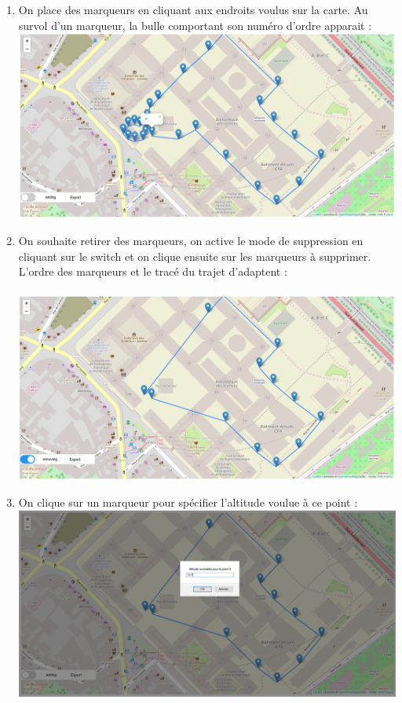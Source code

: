 \documentclass{article}
\begin{document}
\begin{enumerate}
   \item On place des marqueurs en cliquant aux endroits voulus sur la carte. Au survol d'un marqueur, la bulle comportant son numéro d'ordre apparait :\\
 \includegraphics[scale=0.42]{capt3.PNG} \\
  \item On souhaite retirer des marqueurs, on active le mode de suppression en cliquant sur le switch et on clique ensuite sur les marqueurs à supprimer. L'ordre des marqueurs et le tracé du trajet d'adaptent :\\ \\
 \includegraphics[scale=0.42]{capt5.PNG}
  \item On clique sur un marqueur pour spécifier l'altitude voulue à ce point :\\
 \includegraphics[scale=0.42]{capt6.PNG}

\end{enumerate}
\end{document}
